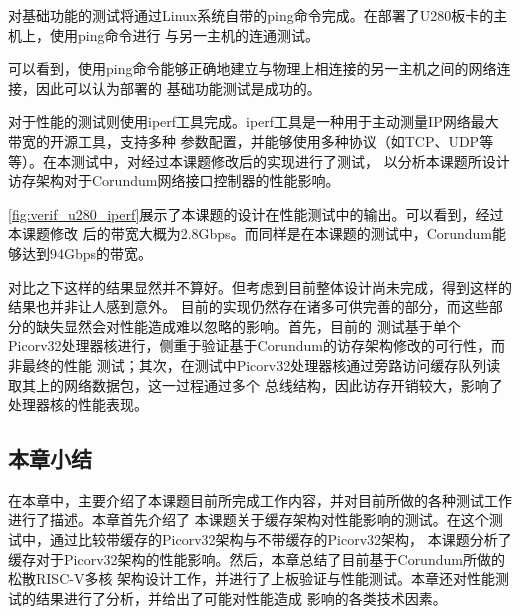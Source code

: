 
对基础功能的测试将通过Linux系统自带的ping命令完成。在部署了U280板卡的主机上，使用ping命令进行
与另一主机的连通测试。


可以看到，使用ping命令能够正确地建立与物理上相连接的另一主机之间的网络连接，因此可以认为部署的
基础功能测试是成功的。


对于性能的测试则使用iperf工具完成。iperf工具是一种用于主动测量IP网络最大带宽的开源工具，支持多种
参数配置，并能够使用多种协议（如TCP、UDP等等）。在本测试中，对经过本课题修改后的实现进行了测试，
以分析本课题所设计访存架构对于Corundum网络接口控制器的性能影响。

\autoref{fig:verif_u280_iperf}展示了本课题的设计在性能测试中的输出。可以看到，经过本课题修改
后的带宽大概为2.8Gbps。而同样是在本课题的测试中，Corundum能够达到94Gbps的带宽。


对比之下这样的结果显然并不算好。但考虑到目前整体设计尚未完成，得到这样的结果也并非让人感到意外。
目前的实现仍然存在诸多可供完善的部分，而这些部分的缺失显然会对性能造成难以忽略的影响。首先，目前的
测试基于单个Picorv32处理器核进行，侧重于验证基于Corundum的访存架构修改的可行性，而非最终的性能
测试；其次，在测试中Picorv32处理器核通过旁路访问缓存队列读取其上的网络数据包，这一过程通过多个
总线结构，因此访存开销较大，影响了处理器核的性能表现。

\subsection{本章小结}

在本章中，主要介绍了本课题目前所完成工作内容，并对目前所做的各种测试工作进行了描述。本章首先介绍了
本课题关于缓存架构对性能影响的测试。在这个测试中，通过比较带缓存的Picorv32架构与不带缓存的Picorv32架构，
本课题分析了缓存对于Picorv32架构的性能影响。然后，本章总结了目前基于Corundum所做的松散RISC-V多核
架构设计工作，并进行了上板验证与性能测试。本章还对性能测试的结果进行了分析，并给出了可能对性能造成
影响的各类技术因素。
